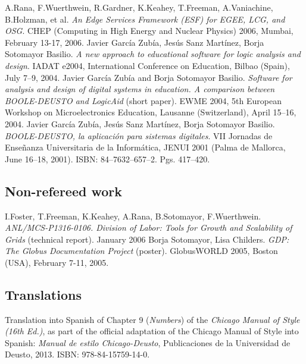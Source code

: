 \documentclass{resume}
\begin{document}
\begin{category}{}
\citembullet A.Rana, F.Wuerthwein, R.Gardner, K.Keahey, T.Freeman, A.Vaniachine, B.Holzman, et al. \emph{An Edge Services Framework (ESF) for EGEE, LCG, and OSG}. CHEP (Computing in High Energy and Nuclear Physics) 2006, Mumbai, February 13-17, 2006.
\citembullet Javier García Zubía, Jesús Sanz Martínez, Borja Sotomayor Basilio. \emph{A new approach to educational software for logic analysis and design}. IADAT e2004, International Conference on Education, Bilbao (Spain), July 7--9, 2004.
\citembullet Javier García Zubía and Borja Sotomayor Basilio. \emph{Software for analysis and design of digital systems in education. A comparison between BOOLE-DEUSTO and LogicAid} (short paper). EWME 2004,  5th European Workshop on Microelectronics Education, Lausanne (Switzerland), April 15--16, 2004.
\citembullet Javier García Zubía, Jesús Sanz Martínez, Borja Sotomayor Basilio. \emph{BOOLE-DEUSTO, la aplicación para
sistemas digitales}. VII Jornadas de Enseñanza Universitaria de la
Informática, JENUI 2001 (Palma de Mallorca, June 16--18, 2001).
ISBN: 84--7632--657--2. Pgs. 417--420.
\end{category}

\subsection*{Non-refereed work}
\begin{category}{}
\citembullet I.Foster, T.Freeman, K.Keahey, A.Rana, B.Sotomayor, F.Wuerthwein. \emph{ANL/MCS-P1316-0106. Division of Labor: Tools for Growth and Scalability of Grids} (technical report). January 2006
\citembullet Borja Sotomayor, Lisa Childers. \emph{GDP: The Globus Documentation Project} (poster). GlobusWORLD 2005, Boston (USA), February 7-11, 2005.
\end{category}

\subsection*{Translations}
\begin{category}{}
\citembullet Translation into Spanish of Chapter 9 (\emph{Numbers}) of the \emph{Chicago Manual of Style (16th Ed.)}, as part of the official adaptation of the Chicago Manual of Style into Spanish: \emph{Manual de estilo Chicago-Deusto}, Publicaciones de la Universidad de Deusto, 2013. ISBN: 978-84-15759-14-0.
\end{category}
\end{document}
